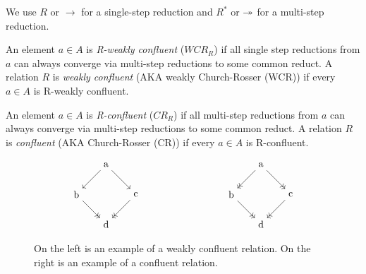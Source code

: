 \documentclass{scrartcl}
\begin{document}
We use $R$ or $\to$ for a single-step reduction and $R^*$ or $\twoheadrightarrow$ for a multi-step reduction.



\begin{dfn}
  An element $a \in A$ is \emph{R-weakly confluent} ($WCR_R$) if all single step reductions from $a$ can always converge
  via multi-step reductions to some common reduct.
  A relation $R$ is \emph{weakly confluent} (AKA weakly Church-Rosser (WCR)) if every $a \in A$ is R-weakly confluent.
\end{dfn}

\begin{dfn}
  An element $a \in A$ is \emph{R-confluent} ($CR_R$) if all multi-step reductions from $a$ can always converge
  via multi-step reductions to some common reduct.
  A relation $R$ is \emph{confluent} (AKA Church-Rosser (CR)) if every $a \in A$ is R-confluent.
\end{dfn}

\begin{figure}[h]
  \centering
\[  \begin{tikzpicture}[node distance=1.5cm, auto]
    \node (top) {a};
    \node (left) [below left of=top] {b};
    \node (right) [below right of=top] {c};
    \node (bottom) [below right of=left] {d};

    \draw[->] (top) -- (left);
    \draw[->] (top) -- (right);
    \draw[->>] (left) -- (bottom);
    \draw[->>] (right) -- (bottom);
\end{tikzpicture}
\hspace{3cm}
\begin{tikzpicture}[node distance=1.5cm, auto]
  \node (top) {a};
  \node (left) [below left of=top] {b};
  \node (right) [below right of=top] {c};
  \node (bottom) [below right of=left] {d};

  \draw[->>] (top) -- (left);
  \draw[->>] (top) -- (right);
  \draw[->>] (left) -- (bottom);
  \draw[->>] (right) -- (bottom);
\end{tikzpicture}
\]
\caption{On the left is an example of a weakly confluent relation. On the right is an example of a confluent relation.}
\end{figure}
\end{document}
